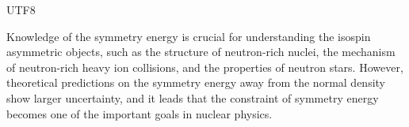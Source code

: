 \documentclass[reprint,aps,prc,twocolumn,superscriptaddress]{revtex4-1}
\begin{document}
\begin{CJK*} {UTF8}{}
\begin{abstract}



\end{abstract}


\maketitle
\end{CJK*}


Knowledge of the symmetry energy is crucial for understanding the isospin asymmetric objects, such as the structure of neutron-rich nuclei, the mechanism of neutron-rich heavy ion collisions, and the properties of neutron stars\cite{BALi08,CJHorowitz2014JPG}. However, theoretical predictions on the symmetry energy away from the normal density show larger uncertainty, and it leads that the constraint of symmetry energy becomes one of the important goals in nuclear physics\cite{Carlson2017,NuPECC17}.
\end{document}
